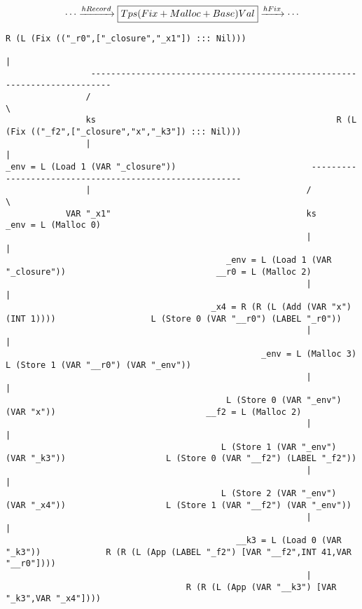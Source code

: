 \begin{landscape}
\begin{gather*}
  \cdots \xrightarrow{hRecord} \boxed{Tps (Fix + Malloc + Base) Val} \xrightarrow{hFix} \cdots
\end{gather*}

\begin{lstlisting}[basicstyle=\fontsize{9}{10}\selectfont\ttfamily]
                                                  R (L (Fix (("_r0",["_closure","_x1"]) ::: Nil)))
                                                                         |
                 --------------------------------------------------------------------------
                /                                                                          \
                ks                                                R (L (Fix (("_f2",["_closure","x","_k3"]) ::: Nil)))
                |                                                                          |
_env = L (Load 1 (VAR "_closure"))                           --------------------------------------------------------
                |                                           /                                                        \
            VAR "_x1"                                       ks                                              _env = L (Malloc 0)
                                                            |                                                        |
                                            _env = L (Load 1 (VAR "_closure"))                              __r0 = L (Malloc 2)
                                                            |                                                        |
                                         _x4 = R (R (L (Add (VAR "x") (INT 1))))                   L (Store 0 (VAR "__r0") (LABEL "_r0"))
                                                            |                                                        |
                                                   _env = L (Malloc 3)                             L (Store 1 (VAR "__r0") (VAR "_env"))
                                                            |                                                        |
                                            L (Store 0 (VAR "_env") (VAR "x"))                              __f2 = L (Malloc 2)
                                                            |                                                        |
                                           L (Store 1 (VAR "_env") (VAR "_k3"))                    L (Store 0 (VAR "__f2") (LABEL "_f2"))
                                                            |                                                        |
                                           L (Store 2 (VAR "_env") (VAR "_x4"))                    L (Store 1 (VAR "__f2") (VAR "_env"))
                                                            |                                                        |
                                              __k3 = L (Load 0 (VAR "_k3"))             R (R (L (App (LABEL "_f2") [VAR "__f2",INT 41,VAR "__r0"])))
                                                            |
                                    R (R (L (App (VAR "__k3") [VAR "_k3",VAR "_x4"])))


\end{lstlisting}
\end{landscape}
